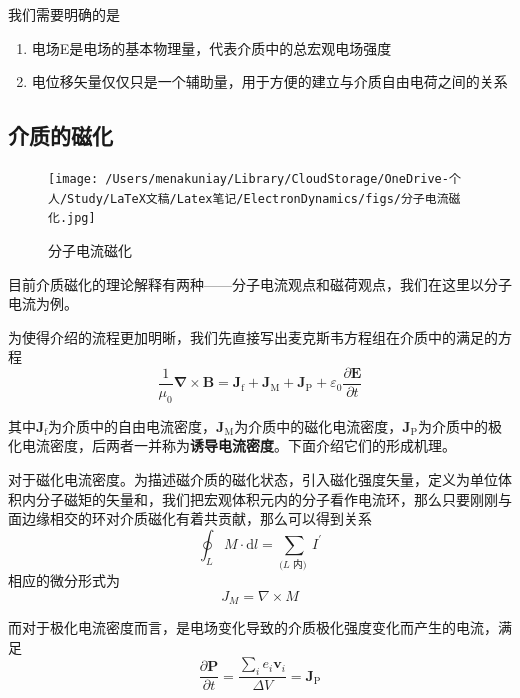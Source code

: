 		我们需要明确的是
		\begin{enumerate}
		\item 电场E是电场的基本物理量，代表介质中的总宏观电场强度
		\item 电位移矢量仅仅只是一个辅助量，用于方便的建立与介质自由电荷之间的关系
		\end{enumerate}

		
	\subsection{介质的磁化}
		\begin{figure}%
	      \centering
	      \texttt{[image: /Users/menakuniay/Library/CloudStorage/OneDrive-个人/Study/LaTeX文稿/Latex笔记/ElectronDynamics/figs/分子电流磁化.jpg]}
	      \caption{分子电流磁化}
	      \end{figure}
		目前介质磁化的理论解释有两种——分子电流观点和磁荷观点，我们在这里以分子电流为例。

		为使得介绍的流程更加明晰，我们先直接写出麦克斯韦方程组在介质中的满足的方程
		\begin{equation}
		\label{eq.4.16}
			\frac{1}{\mu_{0}} \boldsymbol{\nabla} \times \boldsymbol{B}=\boldsymbol{J}_{\mathrm{f}}+\boldsymbol{J}_{\mathrm{M}}+\boldsymbol{J}_{\mathrm{P}}+\varepsilon_{0} \frac{\partial \boldsymbol{E}}{\partial t}
		\end{equation}

		其中$\boldsymbol{J}_{\mathrm{f}}$为介质中的自由电流密度，$\boldsymbol{J}_{\mathrm{M}}$为介质中的磁化电流密度，$\boldsymbol{J}_{\mathrm{P}}$为介质中的极化电流密度，后两者一并称为\textbf{诱导电流密度}。下面介绍它们的形成机理。

		对于磁化电流密度。为描述磁介质的磁化状态，引入磁化强度矢量，定义为单位体积内分子磁矩的矢量和，我们把宏观体积元内的分子看作电流环，那么只要刚刚与面边缘相交的环对介质磁化有着共贡献，那么可以得到关系
		\begin{equation}
			\oint_{L} M \cdot \mathrm{d} l=\sum_{(L \text { 内) }} I^{\prime}
		\end{equation}
		相应的微分形式为
		\begin{equation}
			J_{M}=\nabla \times M
		\end{equation}

		而对于极化电流密度而言，是电场变化导致的介质极化强度变化而产生的电流，满足
		\begin{equation}
			\frac{\partial \boldsymbol{P}}{\partial t}=\frac{\sum_{i} e_{i} \boldsymbol{v}_{i}}{\Delta V}=\boldsymbol{J}_{\mathrm{P}}
		\end{equation}

